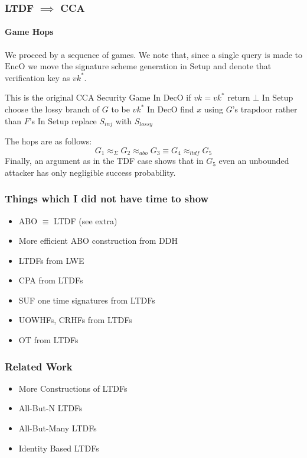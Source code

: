 \documentclass{beamer}
\begin{document}
\begin{frame}
    \frametitle{LTDF $\implies$ CCA}
    \framesubtitle{Game Hops}
    We proceed by a sequence of games. We note that, since a single query
    is made to $\mathrm{EncO}$ we move the signature scheme generation in
    $\mathrm{Setup}$ and denote that verification key as $vk^*$.
    \begin{gamedescription}[name=G]
        \describegame This is the original CCA Security Game
        \describegame In $\mathrm{DecO}$ if $vk=vk^*$ return $\bot$
        \describegame In $\mathrm{Setup}$ choose the lossy branch of $G$ to be $vk^*$
        \describegame In $\mathrm{DecO}$ find $x$ using $G$'s trapdoor rather than $F$'s
        \describegame In $\mathrm{Setup}$ replace $S_{inj}$ with $S_{lossy}$
    \end{gamedescription}
    The hops are as follows:
    \[ G_1 \approx_\Sigma G_2\approx_{abo} G_3 \equiv G_4 \approx_{ltdf} G_5 \]
    Finally, an argument as in the TDF case shows that in $G_5$ even an unbounded attacker has only
    negligible success probability.
\end{frame}
\begin{frame}
    \frametitle{Things which I did not have time to show}
    \begin{itemize}
        \item ABO $\equiv$ LTDF (see extra)
        \item More efficient ABO construction from DDH
        \item LTDFs from LWE
        \item CPA from LTDFs
        \item SUF one time signatures from LTDFs
        \item UOWHFs, CRHFs from LTDFs
        \item OT from LTDFs
    \end{itemize}
\end{frame}

\begin{frame}
    \frametitle{Related Work}
    \begin{itemize}
        \item More Constructions of LTDFs
        \item All-But-N LTDFs
        \item All-But-Many LTDFs
        \item Identity Based LTDFs
    \end{itemize}
\end{frame}
\end{document}
